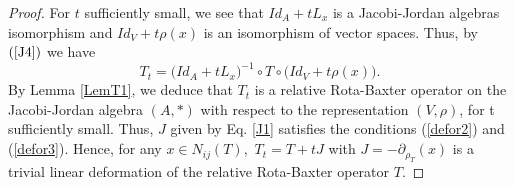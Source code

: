 \documentclass[12pt]{amsart}
\begin{document}
\begin{proof}
For $ t $ sufficiently small, we see that $ Id_{A}+tL_{x} $ is a Jacobi-Jordan algebras isomorphism and $ Id_{V}+t\rho(x) $
is an isomorphism of vector spaces. Thus, by $ (\ref{J4}) $ we have\\
 $$ T_{t}=\bigg(Id_{A}+tL_{x}\bigg)^{-1}\circ T\circ \bigg(Id_{V}+t\rho(x)\bigg). $$ 
 By Lemma \ref{LemT1}, we deduce that $ T_{t} $ is a relative Rota-Baxter operator on the Jacobi-Jordan algebra
 $ (A,\ast) $ with respect to the representation $ (V,\rho) $, for t sufficiently small. Thus, $ J $ given by Eq. \ref{J1} satisfies the conditions (\ref{defor2}) and (\ref{defor3}).
 Hence, for any $x\in N_{ij}(T ),$ $T_t=T + tJ$ with 
  $J=-\partial_{\rho_{T}}(x)$ 	is a
 trivial linear deformation of the relative Rota-Baxter operator $T$.
\end{proof}
\end{document}
